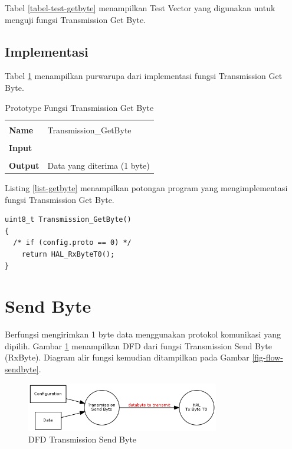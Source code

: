 Tabel \ref{tabel-test-getbyte} menampilkan Test Vector yang digunakan untuk menguji fungsi Transmission Get Byte.

\subsection {Implementasi}

Tabel \ref{tabel-getbyte} menampilkan purwarupa dari implementasi fungsi Transmission Get Byte. 

\begin{table}[!h]
  \centering
  \begin{tabular}{p{2cm} p{8cm}}
    \hline\\
    {\bf Name} & Transmission\_GetByte\\
    \hline\\
    {\bf Input} & 
    \\
    \hline\\
    {\bf Output} & Data yang diterima (1 byte)
    \\
    \hline
  \end{tabular}
  \caption{Prototype Fungsi Transmission Get Byte}
  \label{tabel-getbyte}
\end{table}

Listing \ref{list-getbyte} menampilkan potongan program yang mengimplementasi fungsi Transmission Get Byte.

\begin{lstlisting}[caption={Listing Program Fungsi Transmisison Get Byte}, label={list-getbyte}]
uint8_t Transmission_GetByte()
{
  /* if (config.proto == 0) */
    return HAL_RxByteT0();
}
\end{lstlisting}


\section{Send Byte}
\label{sec_sendbyte}

Berfungsi mengirimkan 1 byte data menggunakan protokol komunikasi yang dipilih. Gambar \ref{fig-dfd-sendbyte} menampilkan DFD dari fungsi Transmission Send Byte (RxByte). Diagram alir fungsi kemudian ditampilkan pada Gambar \ref{fig-flow-sendbyte}. 

\begin{figure}[!h]
\centering
\includegraphics[width=0.75\textwidth]{image/transmission/dfd_sendbyte.png}
\caption{DFD Transmission Send Byte}
\label{fig-dfd-sendbyte}
\end{figure}


